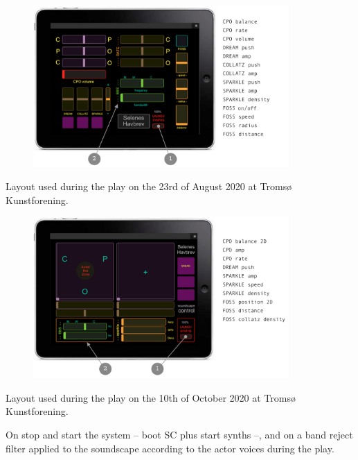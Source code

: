 \begin{description}
\begin{enumerate}
\begin{figure}[H]
\hfill \includegraphics[width=0.87\textwidth]{mp/img/ipad1}
\end{figure}
\vspace{-5mm}
Layout used during the play on the 23rd of August 2020 at Troms\o{} Kunstforening.
\begin{figure}[H]
\hfill \includegraphics[width=0.87\textwidth]{mp/img/ipad2}
\end{figure}
\vspace{-5mm}
Layout used during the play on the 10th of October 2020 at Troms\o{} Kunstforening.
\end{enumerate}
\end{description}

On \textcolor{gray}{\large{}} stop and start the system -- boot SC plus start synths --, and on \textcolor{gray}{\large{}} a band reject filter applied to the soundscape according to the actor voices during the play.

\bigskip


